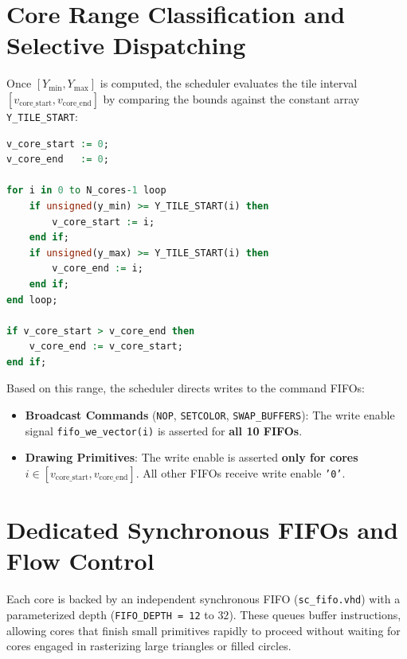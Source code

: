 \section{Core Range Classification and Selective Dispatching}
Once $[Y_{\min}, Y_{\max}]$ is computed, the scheduler evaluates the tile interval $[v_{\text{core\_start}}, v_{\text{core\_end}}]$ by comparing the bounds against the constant array \texttt{Y\_TILE\_START}:
\begin{lstlisting}[language=VHDL, caption={Core Range Classification Logic in \texttt{spScheduler.vhd}.}, label={lst:sched_range}]
v_core_start := 0;
v_core_end   := 0;

for i in 0 to N_cores-1 loop
    if unsigned(y_min) >= Y_TILE_START(i) then 
        v_core_start := i; 
    end if;
    if unsigned(y_max) >= Y_TILE_START(i) then 
        v_core_end := i; 
    end if;
end loop;

if v_core_start > v_core_end then
    v_core_end := v_core_start;
end if;
\end{lstlisting}

Based on this range, the scheduler directs writes to the command FIFOs:
\begin{itemize}
    \item \textbf{Broadcast Commands} (\texttt{NOP}, \texttt{SETCOLOR}, \texttt{SWAP\_BUFFERS}): The write enable signal \texttt{fifo\_we\_vector(i)} is asserted for \textbf{all 10 FIFOs}.
    \item \textbf{Drawing Primitives}: The write enable is asserted \textbf{only for cores $i \in [v_{\text{core\_start}}, v_{\text{core\_end}}]$}. All other FIFOs receive write enable \texttt{'0'}.
\end{itemize}

\section{Dedicated Synchronous FIFOs and Flow Control}
Each core is backed by an independent synchronous FIFO (\texttt{sc\_fifo.vhd}) with a parameterized depth (\texttt{FIFO\_DEPTH = 12} to $32$). These queues buffer instructions, allowing cores that finish small primitives rapidly to proceed without waiting for cores engaged in rasterizing large triangles or filled circles.


